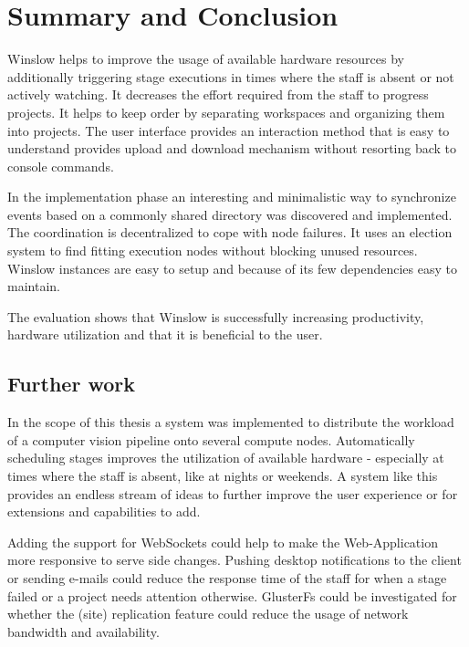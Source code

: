\chapter{Summary and Conclusion}

Winslow helps to improve the usage of available hardware resources by additionally triggering stage executions in times where the staff is absent or not actively watching.
It decreases the effort required from the staff to progress projects.
It helps to keep order by separating workspaces and organizing them into projects.
The user interface provides an interaction method that is easy to understand provides upload and download mechanism without resorting back to console commands.

In the implementation phase an interesting and minimalistic way to synchronize events based on a commonly shared directory was discovered and implemented.
The coordination is decentralized to cope with node failures.
It uses an election system to find fitting execution nodes without blocking unused resources.
Winslow instances are easy to setup and because of its few dependencies easy to maintain.


The evaluation shows that Winslow is successfully increasing productivity, hardware utilization and that it is beneficial to the user.


\pagebreak
\section{Further work}


In the scope of this thesis a system was implemented to distribute the workload of a computer vision pipeline onto several compute nodes.
Automatically scheduling stages improves the utilization of available hardware - especially at times where the staff is absent, like at nights or weekends.
A system like this provides an endless stream of ideas to further improve the user experience or for extensions and capabilities to add.

Adding the support for WebSockets could help to make the Web-Application more responsive to serve side changes.
Pushing desktop notifications to the client or sending e-mails could reduce the response time of the staff for when a stage failed or a project needs attention otherwise.
GlusterFs could be investigated for whether the (site) replication feature could reduce the usage of network bandwidth and availability.
